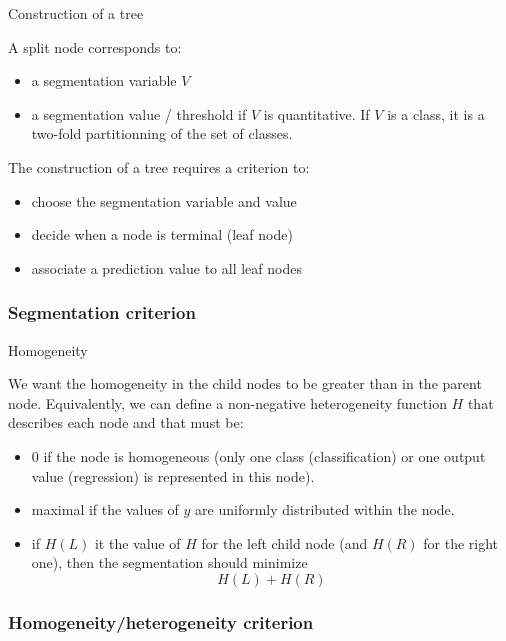 \documentclass[usenames,dvipsnames]{beamer}
\begin{document}
\begin{frame}{Construction of a tree}
    
    A split node corresponds to:
    \begin{itemize}
        \item a segmentation variable $V$
	\item a segmentation value / threshold if $V$ is quantitative. If $V$ is a class, it is a two-fold partitionning of the set of classes.
    \end{itemize}
   The construction of a tree requires a criterion to:
    \begin{itemize}
        \item choose the segmentation variable and value
	\item decide when a node is terminal (leaf node)
	\item associate a prediction value to all leaf nodes
    \end{itemize}
\end{frame}

\subsubsection{Segmentation criterion}
\label{ssub:segmentation_criterion}

\begin{frame}{Homogeneity}

    We want the homogeneity in the child nodes to be greater than in the parent node. Equivalently, we can define a non-negative heterogeneity function $H$ that describes each node and that must be:
    \begin{itemize}
	\item $0$ if the node is homogeneous (only one class (classification) or one output value (regression) is represented in this node).
	\item maximal if the values of $y$ are uniformly distributed within the node.
	\item if $H(L)$ it the value of $H$ for the left child node (and $H(R)$ for the right one), then the segmentation should minimize
	    \begin{equation}
		H(L)+H(R)
	    \end{equation}
    \end{itemize}
\end{frame}

\subsubsection{Homogeneity/heterogeneity criterion}%
\label{ssub:homogeneity_criterion}
\end{document}
